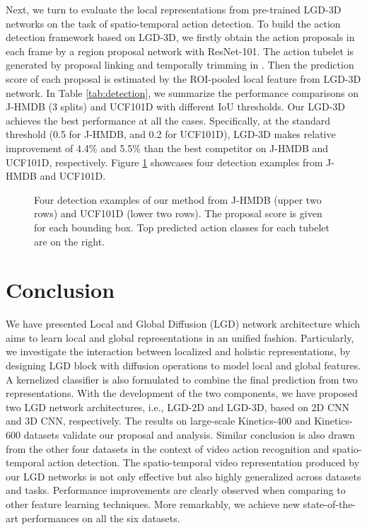 \documentclass[10pt,twocolumn,letterpaper]{article}
\begin{document}
Next, we turn to evaluate the local representations from pre-trained LGD-3D networks on the task of spatio-temporal action detection. To build the action detection framework based on LGD-3D, we firstly obtain the action proposals in each frame by a region proposal network \cite{ren2015faster} with ResNet-101. The action tubelet is generated by proposal linking and temporally trimming in \cite{saha2016deep}. Then the prediction score of each proposal is estimated by the ROI-pooled local feature from LGD-3D network. In Table \ref{tab:detection}, we summarize the performance comparisons on J-HMDB (3 splits) and UCF101D with different IoU thresholds. Our LGD-3D achieves the best performance at all the cases. Specifically, at the standard threshold (0.5 for J-HMDB, and 0.2 for UCF101D), LGD-3D makes relative improvement of 4.4\% and 5.5\% than the best competitor \cite{li2018recurrent} on J-HMDB and UCF101D, respectively. Figure \ref{fig:Examples} showcases four detection examples from J-HMDB and UCF101D.

\begin{figure}[!tb]
   \caption{\small Four detection examples of our method from J-HMDB (upper two rows) and UCF101D (lower two rows). The proposal score is given for each bounding box. Top predicted action classes for each tubelet are on the right.}
   \label{fig:Examples}
   \vspace{-0.15in}
\end{figure}

\section{Conclusion}
We have presented Local and Global Diffusion (LGD) network architecture which aims to learn local and global representations in an unified fashion. Particularly, we investigate the interaction between localized and holistic representations, by designing LGD block with diffusion operations to model local and global features.
A kernelized classifier is also formulated to combine the final prediction from two representations. With the development of the two components, we have proposed two LGD network architectures, i.e., LGD-2D and LGD-3D, based on 2D CNN and 3D CNN, respectively. The results on large-scale Kinetics-400 and Kinetics-600 datasets validate our proposal and analysis. Similar conclusion is also drawn from the other four datasets in the context of video action recognition and spatio-temporal action detection. The spatio-temporal video representation produced by our LGD networks is not only effective but also highly generalized across datasets and tasks.
Performance improvements are clearly observed when comparing to other feature learning techniques. More remarkably, we achieve new state-of-the-art performances on all the six datasets.
\end{document}
